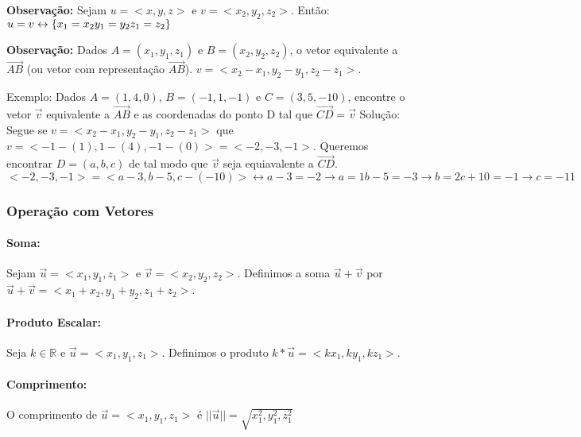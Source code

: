 \textbf{Observação:} Sejam $u=<x,y,z>$ e $v=<x_2,y_2,z_2>$. Então: $u=v \leftrightarrow \{x_1 = x_2 \\ y_1 = y_2 \\ z_1 = z_2 \}$


\textbf{Observação:} Dados $A=(x_1,y_1,z_1)$ e $B=(x_2,y_2,z_2)$, o vetor equivalente a $\overrightarrow{AB}$ (ou vetor com representação $\overrightarrow{AB}$). $v = <x_2-x_1, y_2-y_1, z_2-z_1>$.


Exemplo: Dados $A=(1,4,0)$, $B=(-1,1,-1)$ e $C = (3,5,-10)$, encontre o vetor $\overrightarrow{v}$ equivalente a $\overrightarrow{AB}$ e as coordenadas do ponto D tal que $\overrightarrow{CD} = \overrightarrow{v}$
Solução: Segue se $v = <x_2-x_1, y_2-y_1, z_2-z_1>$ que $v=<-1-(1), 1-(4), -1-(0)> = <-2,-3,-1>$. 
Queremos encontrar $D=(a,b,c)$ de tal modo que $\overrightarrow{v}$ seja equiavalente a $\overrightarrow{CD}$.
$<-2,-3,-1> = <a-3,b-5,c-(-10)> \leftrightarrow {a-3 = -2 \rightarrow a=1} {b-5 = -3 \rightarrow b=2} {c+10 = -1 \rightarrow c=-11}$ 

\subsubsection{Operação com Vetores}
\paragraph{Soma:} Sejam $\overrightarrow{u} = <x_1,y_1,z_1>$ e $\overrightarrow{v} = <x_2,y_2,z_2>$. Definimos a soma $\overrightarrow{u} + \overrightarrow{v}$ por $\overrightarrow{u} + \overrightarrow{v} = <x_1+x_2, y_1+y_2, z_1+z_2>$.
\paragraph{Produto Escalar:} Seja $k \in \mathbb{R}$ e $\overrightarrow{u} = <x_1,y_1,z_1>$. Definimos o produto $k*\overrightarrow{u} = <kx_1, ky_1, kz_1>$.
\paragraph{Comprimento:} O comprimento de $\overrightarrow{u} = <x_1, y_1, z_1>$ é $|| \overrightarrow{u} || = \sqrt{x_1^2, y_1^2, z_1^2}$
